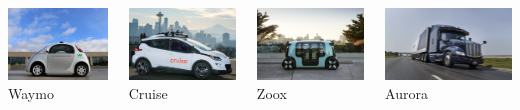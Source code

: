 \begin{frame}
\begin{columns}[T]
    \begin{column}{.25\textwidth}
        \centering
        \includegraphics[height=1.9cm]{images/waymo_firefly.jpg} \\
        \footnotesize Waymo \cite{WaymoPress}
    \end{column}
    \begin{column}{.25\textwidth}
        \centering
        \includegraphics[height=1.9cm]{images/cruise_vehicle.jpg} \\
        \footnotesize Cruise \cite{CruiseNews}
    \end{column}
    \begin{column}{.25\textwidth}
        \centering
        \includegraphics[height=1.9cm]{images/zoox_vehicle.jpg} \\
        \footnotesize Zoox \cite{ZooxPress}
    \end{column}
    \begin{column}{.25\textwidth}
        \centering
        \includegraphics[height=1.9cm]{images/aurora_truck.jpg} \\
        \footnotesize Aurora \cite{AuroraMedia}
    \end{column}
\end{columns}
\end{frame}

